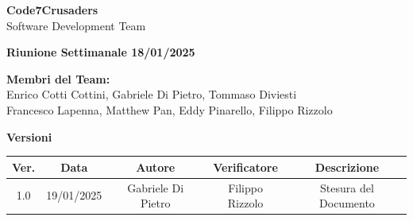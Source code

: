 \documentclass{article}
\begin{document}
\begin{titlepage}
    {\Huge \textbf{Code7Crusaders}}\\
    \vspace{0.5cm}
    {\Large Software Development Team}\\
    \vspace{2cm}
        
        {\large \textbf{Riunione Settimanale 18/01/2025}}\\
    \vspace{5cm}                           %
    
    
    \textbf{Membri del Team:}\\
    Enrico Cotti Cottini, Gabriele Di Pietro, Tommaso Diviesti \\
    Francesco Lapenna, Matthew Pan, Eddy Pinarello, Filippo Rizzolo \\
    \vspace{0.5cm}
    
    \vspace{1cm}
\end{titlepage}



\newpage
\begin{table}[h!]
\centering
\textbf{Versioni} \\ %
\vspace{2mm} %
\begin{tabular}{|c|c|c|c|c|}
    \hline
    \textbf{Ver.} & \textbf{Data} & \textbf{Autore} & \textbf{Verificatore} & \textbf{Descrizione} \\
    \hline
    1.0 & 19/01/2025 & Gabriele Di Pietro & Filippo Rizzolo & Stesura del Documento \\ 
    \hline                                  %
\end{tabular}
\end{table}

\newpage
\tableofcontents

\newpage
\end{document}
